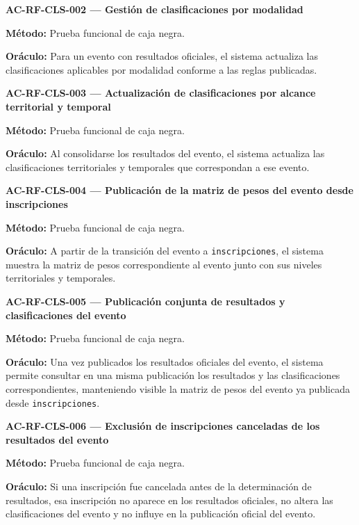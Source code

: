 \documentclass[10pt,letterpaper]{article}
\begin{document}
\noindent\textbf{AC-RF-CLS-002 --- Gestión de clasificaciones por modalidad}\par
\textbf{Método:} Prueba funcional de caja negra.\par
\textbf{Oráculo:} Para un evento con resultados oficiales, el sistema actualiza las clasificaciones aplicables por modalidad conforme a las reglas publicadas.\par\vspace{0.45em}
\noindent\textbf{AC-RF-CLS-003 --- Actualización de clasificaciones por alcance territorial y temporal}\par
\textbf{Método:} Prueba funcional de caja negra.\par
\textbf{Oráculo:} Al consolidarse los resultados del evento, el sistema actualiza las clasificaciones territoriales y temporales que correspondan a ese evento.\par\vspace{0.45em}
\noindent\textbf{AC-RF-CLS-004 --- Publicación de la matriz de pesos del evento desde inscripciones}\par
\textbf{Método:} Prueba funcional de caja negra.\par
\textbf{Oráculo:} A partir de la transición del evento a \texttt{inscripciones}, el sistema muestra la matriz de pesos correspondiente al evento junto con sus niveles territoriales y temporales.\par\vspace{0.45em}
\noindent\textbf{AC-RF-CLS-005 --- Publicación conjunta de resultados y clasificaciones del evento}\par
\textbf{Método:} Prueba funcional de caja negra.\par
\textbf{Oráculo:} Una vez publicados los resultados oficiales del evento, el sistema permite consultar en una misma publicación los resultados y las clasificaciones correspondientes, manteniendo visible la matriz de pesos del evento ya publicada desde \texttt{inscripciones}.\par\vspace{0.45em}
\noindent\textbf{AC-RF-CLS-006 --- Exclusión de inscripciones canceladas de los resultados del evento}\par
\textbf{Método:} Prueba funcional de caja negra.\par
\textbf{Oráculo:} Si una inscripción fue cancelada antes de la determinación de resultados, esa inscripción no aparece en los resultados oficiales, no altera las clasificaciones del evento y no influye en la publicación oficial del evento.\par\vspace{0.45em}
\end{document}

